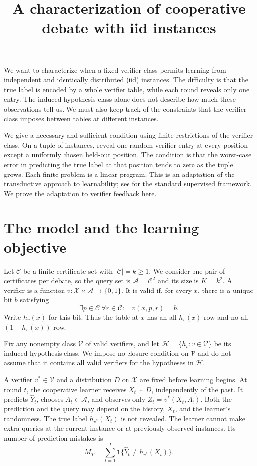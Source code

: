 \documentclass[11pt]{article}
\title{A characterization of cooperative debate with iid instances}
\author{}
\date{}
\newcommand{\X}{\mathcal X}
\newcommand{\C}{\mathcal C}
\newcommand{\V}{\mathcal V}
\newcommand{\Hclass}{\mathcal H}
\newcommand{\A}{\mathcal A}
\newcommand{\ind}{\mathbf 1}
\begin{document}
\maketitle

We want to characterize when a fixed verifier class permits learning from
independent and identically distributed (iid) instances. The difficulty is
that the true label is encoded by a whole verifier table, while each round
reveals only one entry. The induced hypothesis class alone does not describe
how much these observations tell us. We must also keep track of the
constraints that the verifier class imposes between tables at different
instances.

We give a necessary-and-sufficient condition using finite restrictions of
the verifier class. On a tuple of instances, reveal one random verifier entry
at every position except a uniformly chosen held-out position. The condition
is that the worst-case error in predicting the true label at that position
tends to zero as the tuple grows. Each finite problem is a linear program.
This is an adaptation of the transductive approach to learnability; see
\citet{asilis2024transductive} for the standard supervised framework. We prove
the adaptation to verifier feedback here.

\section{The model and the learning objective}\label{sec:model}

Let $\C$ be a finite certificate set with $|\C|=k\ge1$. We consider one pair
of certificates per debate, so the query set is $\A=\C^2$ and its size is
$K=k^2$. A verifier is a function $v:\X\times\A\to\{0,1\}$. It is valid
if, for every $x$, there is a unique bit $b$ satisfying
\[
\exists p\in\C\ \forall r\in\C:\quad v(x,p,r)=b.
\]
Write $h_v(x)$ for this bit. Thus the table at $x$ has an all-$h_v(x)$ row
and no all-$(1-h_v(x))$ row.

Fix any nonempty class $\V$ of valid verifiers, and let
$\Hclass=\{h_v:v\in\V\}$ be its induced hypothesis class. We impose no
closure condition on $\V$ and do not assume that it contains all valid
verifiers for the hypotheses in $\Hclass$.

A verifier $v^*\in\V$ and a distribution $D$ on $\X$ are fixed before
learning begins. At round $t$, the cooperative learner receives
$X_t\sim D$, independently of the past. It predicts $\hat Y_t$, chooses
$A_t\in\A$, and observes only $Z_t=v^*(X_t,A_t)$. Both the prediction and
the query may depend on the history, $X_t$, and the learner's randomness.
The true label $h_{v^*}(X_t)$ is not revealed. The learner cannot make extra
queries at the current instance or at previously observed instances.
Its number of prediction mistakes is
\[
M_T=\sum_{t=1}^T\ind\{\hat Y_t\ne h_{v^*}(X_t)\}.
\]
\end{document}
